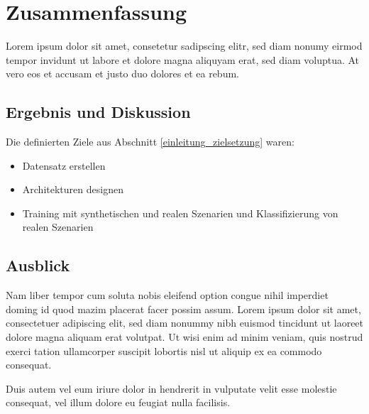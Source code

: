 
\chapter{Zusammenfassung}
\label{zusammenfassung}

Lorem ipsum dolor sit amet, consetetur sadipscing elitr, sed diam nonumy eirmod tempor invidunt ut labore et dolore magna aliquyam erat, sed diam voluptua. At vero eos et accusam et justo duo dolores et ea rebum. 


\section{Ergebnis und Diskussion}
\label{zusammenfassung_ergebnis}

Die definierten Ziele aus Abschnitt \ref{einleitung_zielsetzung} waren:

\begin{itemize}
\item Datensatz erstellen
\item Architekturen designen
\item Training mit synthetischen und realen Szenarien und Klassifizierung von realen Szenarien
\end{itemize} 

 
 \section{Ausblick}
 \label{zusammenfassung_ausblick}

Nam liber tempor cum soluta nobis eleifend option congue nihil imperdiet doming id quod mazim placerat facer possim assum. Lorem ipsum dolor sit amet, consectetuer adipiscing elit, sed diam nonummy nibh euismod tincidunt ut laoreet dolore magna aliquam erat volutpat. Ut wisi enim ad minim veniam, quis nostrud exerci tation ullamcorper suscipit lobortis nisl ut aliquip ex ea commodo consequat.   

Duis autem vel eum iriure dolor in hendrerit in vulputate velit esse molestie consequat, vel illum dolore eu feugiat nulla facilisis.

